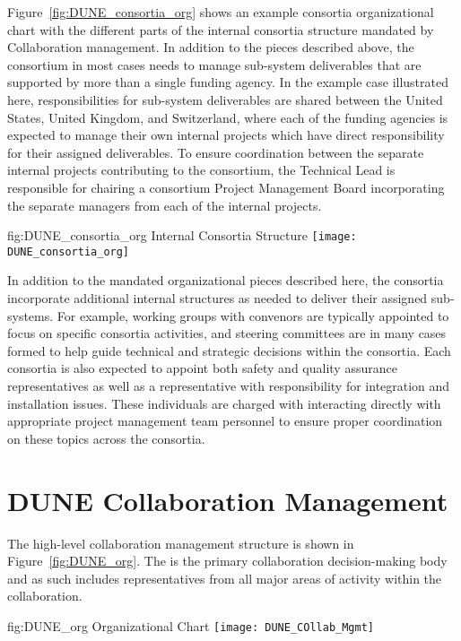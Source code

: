 Figure~\ref{fig:DUNE_consortia_org} shows an example consortia organizational 
chart with the different parts of the internal consortia structure mandated 
by  Collaboration management.  In addition to the pieces described 
above, the consortium in most cases needs to manage sub-system deliverables 
that are supported by more than a single funding agency.  In the example case 
illustrated here, responsibilities for sub-system deliverables are shared 
between the United States, United Kingdom, and Switzerland, where each of the 
funding agencies is expected to manage their own internal projects which have
direct responsibility for their assigned deliverables.  To ensure coordination
between the separate internal projects contributing to the consortium, the 
Technical Lead is responsible for chairing a consortium Project Management 
Board incorporating the separate managers from each of the internal projects.   
\begin{dunefigure}{fig:DUNE_consortia_org}
  { Internal Consortia Structure}
  \texttt{[image: DUNE\_consortia\_org]}
\end{dunefigure}

In addition to the mandated organizational pieces described here, the consortia 
incorporate additional internal structures as needed to deliver their assigned 
sub-systems.  For example, working groups with convenors are typically appointed 
to focus on specific consortia activities, and steering committees are in many 
cases formed to help guide technical and strategic decisions within the consortia.
Each consortia is also expected to appoint both safety and quality assurance  
representatives as well as a representative with responsibility for integration 
and installation issues.  These individuals are charged with interacting directly 
with appropriate project management team personnel to ensure proper coordination 
on these topics across the consortia.        

\section{DUNE Collaboration Management}
\label{sec:dune_mgmt}

The high-level  collaboration management structure is shown 
in Figure~\ref{fig:DUNE_org}.  The   is the primary
collaboration decision-making body and as such includes representatives from 
all major areas of activity within the collaboration.
\begin{dunefigure}{fig:DUNE_org}
  { Organizational Chart}
  \texttt{[image: DUNE\_COllab\_Mgmt]}
\end{dunefigure}

